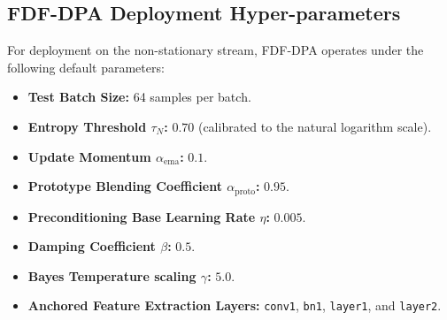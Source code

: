 \documentclass{article}
\theoremstyle{plain}
\theoremstyle{definition}
\theoremstyle{remark}
\begin{document}
\subsection{FDF-DPA Deployment Hyper-parameters}
For deployment on the non-stationary stream, FDF-DPA operates under the following default parameters:
\begin{itemize}
    \item \textbf{Test Batch Size:} 64 samples per batch.
    \item \textbf{Entropy Threshold $\tau_N$:} $0.70$ (calibrated to the natural logarithm scale).
    \item \textbf{Update Momentum $\alpha_{\text{ema}}$:} $0.1$.
    \item \textbf{Prototype Blending Coefficient $\alpha_{\text{proto}}$:} $0.95$.
    \item \textbf{Preconditioning Base Learning Rate $\eta$:} $0.005$.
    \item \textbf{Damping Coefficient $\beta$:} $0.5$.
    \item \textbf{Bayes Temperature scaling $\gamma$:} $5.0$.
    \item \textbf{Anchored Feature Extraction Layers:} \texttt{conv1}, \texttt{bn1}, \texttt{layer1}, and \texttt{layer2}.
\end{itemize}
\end{document}
